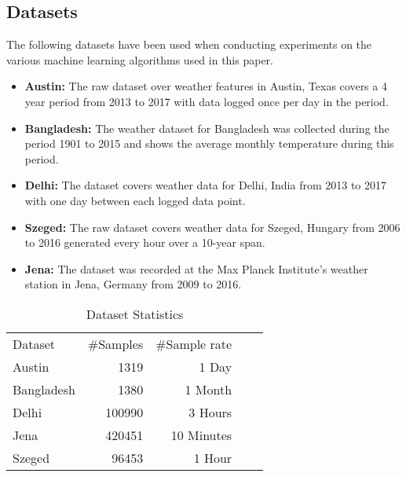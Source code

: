 \subsection{Datasets}
The following datasets have been used when conducting experiments on the various machine learning algorithms used in this paper.
\begin{itemize}
    \item \textbf{Austin:} The raw dataset over weather features in Austin, Texas covers a 4 year period from 2013 to 2017 with data logged once per day in the period.
    \item \textbf{Bangladesh:} The weather dataset for Bangladesh was collected during the period 1901 to 2015 and shows the average monthly temperature during this period. 
    \item \textbf{Delhi:} The dataset covers weather data for Delhi, India from 2013 to 2017 with one day between each logged data point.
    \item \textbf{Szeged:} The raw dataset covers weather data for Szeged, Hungary from 2006 to 2016 generated every hour over a 10-year span.
    \item \textbf{Jena:} The dataset was recorded at the Max Planck Institute's weather station in Jena, Germany from 2009 to 2016.
\end{itemize}

\begin{table}[!ht]
\centering
\caption {Dataset Statistics} \label{tab:DatasetTable}
\begin{tabular}{|l|r|r|ll}
\cline{1-3}
Dataset    & \multicolumn{1}{l|}{\#Samples} & \multicolumn{1}{l|}{\#Sample rate} &  &  \\ \cline{1-3}
Austin     & 1319                           & 1 Day                              &  &  \\ \cline{1-3}
Bangladesh & 1380                           & 1 Month                            &  &  \\ \cline{1-3}
Delhi      & 100990                         & 3 Hours                            &  &  \\ \cline{1-3}
Jena       & 420451                         & 10 Minutes                         &  &  \\ \cline{1-3}
Szeged     & 96453                          & 1 Hour                             &  &  \\ \cline{1-3}
\end{tabular}
\end{table}

